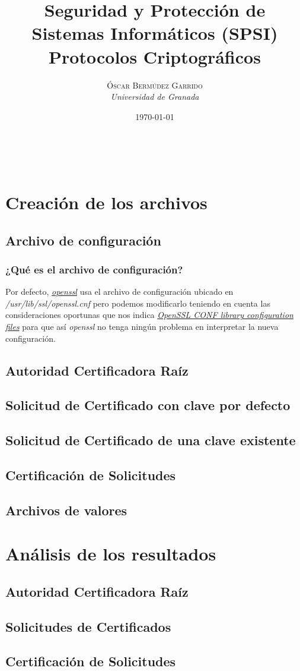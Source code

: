 \documentclass[a4paper, 11pt]{article}
\title{\textbf{Seguridad y Protección de Sistemas Informáticos (SPSI)}\\ %
Protocolos Criptográficos} %
\author{\textsc{Óscar Bermúdez Garrido} %
\\{\textit{Universidad de Granada}}} %
\date{\today} %
\makeatletter
\renewcommand{\maketitle}{
  \begin{flushright} %
  
  {\LARGE\@title} %
  
  \vspace{50pt} %
  
  {\large\@author} %
  \\\@date %
  \vspace{40pt} %
  \end{flushright}
}
\makeatother
\begin{document}
\maketitle %

\renewcommand{\abstractname}{Resumen} %

{\parskip=2pt
  \tableofcontents
}
\pagebreak


\section{Creación de los archivos}
	\subsection{Archivo de configuración}
		\subsubsection{¿Qué es el archivo de configuración?}
			Por defecto, \href{http://manpages.ubuntu.com/manpages/zesty/en/man1/openssl.1ssl.html}{\textit{openssl}} usa el
			archivo de configuración ubicado en \textit{/usr/lib/ssl/openssl.cnf} pero podemos modificarlo teniendo en cuenta
			las consideraciones oportunas que nos indica \href{https://www.openssl.org/docs/man1.0.2/apps/config.html}
			{\textit{OpenSSL CONF library configuration files}} para que así \textit{openssl} no tenga ningún problema en
			interpretar la nueva configuración.
			
	\subsection{Autoridad Certificadora Raíz}
	\subsection{Solicitud de Certificado con clave por defecto}
	\subsection{Solicitud de Certificado de una clave existente}
	\subsection{Certificación de Solicitudes}
	\subsection{Archivos de valores}
			
\section{Análisis de los resultados}
	\subsection{Autoridad Certificadora Raíz}
	\subsection{Solicitudes de Certificados}
	\subsection{Certificación de Solicitudes}
	
\end{document}
